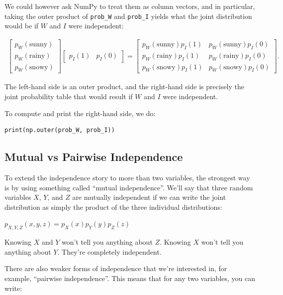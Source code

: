 \documentclass[6008notes.tex]{subfiles}
\begin{document}
We could however ask NumPy to treat them as column vectors, and in particular, taking the outer product of \lstinline{prob_W} and \lstinline{prob_I} yields what the joint distribution would be if $W$ and $I$ were independent:

\begin{eqnarray*}
\begin{bmatrix}
p_W(\text{sunny}) \\
p_W(\text{rainy}) \\
p_W(\text{snowy})
\end{bmatrix}
\begin{bmatrix}
p_I(1) & p_I(0)
\end{bmatrix}
=
\begin{bmatrix}
p_W(\text{sunny})p_I(1) & p_W(\text{sunny})p_I(0) \\
p_W(\text{rainy})p_I(1) & p_W(\text{rainy})p_I(0) \\
p_W(\text{snowy})p_I(1) & p_W(\text{snowy})p_I(0)
\end{bmatrix}.
\end{eqnarray*}

The left-hand side is an outer product, and the right-hand side is precisely the joint probability table that would result if $W$ and $I$ were independent.

To compute and print the right-hand side, we do:

\begin{lstlisting}
print(np.outer(prob_W, prob_I))
\end{lstlisting}


\subsection{Mutual vs Pairwise Independence}

To extend the independence story to more than two variables, the strongest way is by using something called ``mutual independence''. We'll say that three random variables  $X$, $Y$, and $Z$ are mutually independent if we can write  the joint distribution as simply the product of the three individual distributions:

{\centering$p_{X,Y,Z} (x,y,z) = p_X(x) p_Y(y) p_Z(z)$ \par}

Knowing $X$ and $Y$ won't tell you anything about $Z$. Knowing $X$ won't tell you anything about $Y$. They're completely independent.

There are also weaker forms of independence that we're interested in, for example, ``pairwise independence''. This means that for any two variables, you can write:
\end{document}
